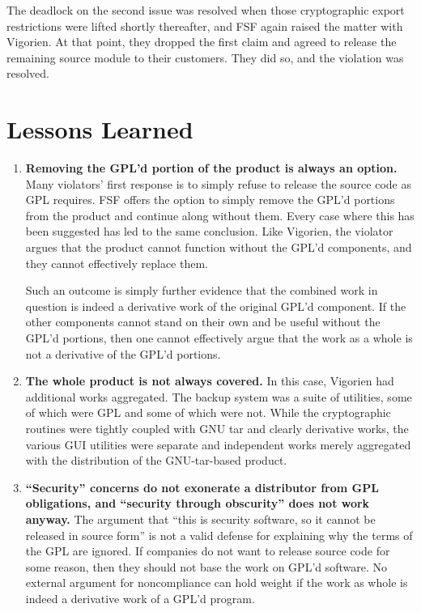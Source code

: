 {The deadlock on the second issue was resolved when those cryptographic
export restrictions were lifted shortly thereafter, and FSF again raised
the matter with Vigorien. At that point, they dropped the first claim and
agreed to release the remaining source module to their customers. They
did so, and the violation was resolved.


\section{Lessons Learned}

\begin{enumerate}

\item {\bf Removing the GPL'd portion of the product is always an
  option.}  Many violators' first response is to simply refuse to
  release the source code as GPL requires. FSF offers the option to
  simply remove the GPL'd portions from the product and continue along
  without them. Every case where this has been suggested has led to
  the same conclusion. Like Vigorien, the violator argues that the
  product cannot function without the GPL'd components, and they
  cannot effectively replace them.

  Such an outcome is simply further evidence that the combined work in
  question is indeed a derivative work of the original GPL'd component.
  If the other components cannot stand on their own and be useful without
  the GPL'd portions, then one cannot effectively argue that the work as a
  whole is not a derivative of the GPL'd portions.

\item {\bf The whole product is not always covered.}  In this case,
  Vigorien had additional works aggregated. The backup system was a suite
  of utilities, some of which were GPL and some of which were not. While
  the cryptographic routines were tightly coupled with GNU tar and clearly
  derivative works, the various GUI utilities were separate and
  independent works merely aggregated with the distribution of the
  GNU-tar-based product.


\item {\bf ``Security'' concerns do not exonerate a distributor from GPL
  obligations, and ``security through obscurity'' does not work anyway.}
  The argument that ``this is security software, so it cannot be released
  in source form'' is not a valid defense for explaining why the terms of
  the GPL are ignored. If companies do not want to release source code
  for some reason, then they should not base the work on GPL'd software.
  No external argument for noncompliance can hold weight if the work as
  whole is indeed a derivative work of a GPL'd program.


\end{enumerate}}
